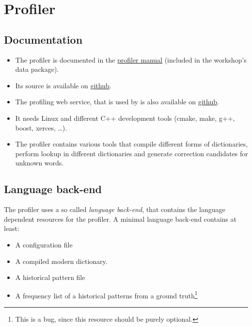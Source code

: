 \section{Profiler}
\subsection{Documentation}
\begin{frame}
	\begin{itemize}
		\item The profiler is documented in the
			\href{https://github.com/cisocrgroup/Resources/blob/master/manuals/profiler-manual.pdf}{profiler
			manual} (included in the workshop's data package).
		\item Its source is available on \href{https://github.com/cisocrgroup/Profiler}{github}.
		\item The profiling web service, that is used by \pocoto{} is also available
			on \href{https://github.com/cisocrgroup/ProfilerWebService}{github}.
		\item It needs Linux and different C++ development tools (cmake, make, g++,
			boost, xerces, \dots).
		\item The profiler contains various tools that compile different forms of
			dictionaries, perform lookup in different dictionaries and generate
			correction candidates for unknown words.
	\end{itemize}
\end{frame}

\subsection{Language back-end}
\begin{frame}
	The profiler uses a so called \emph{language back-end}, that contains the
	language dependent resources for the profiler. A minimal language back-end
	contains at least:
	\begin{itemize}
		\item A configuration file
		\item A compiled modern dictionary.
		\item A historical pattern file \item A frequency list of a historical
			patterns from a ground truth\footnote{This is a bug, since this resource
			should be purely optional.}
	\end{itemize}
\end{frame}

